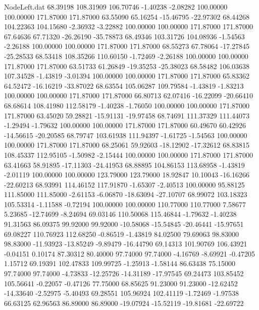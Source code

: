 \begin{filecontents}{NodeLeft.dat}
  68.39198  108.31909  106.70746    -1.40238   -2.08282  100.00000  100.00000  171.87000  171.87000   63.55090   65.16254  -15.46795  -22.97302
  68.44268  104.22363  104.15680    -2.36932   -3.22882  100.00000  100.00000  171.87000  171.87000   67.64636   67.71320  -26.26190  -35.78873
  68.49346  103.31726  104.08936    -1.54563   -2.26188  100.00000  100.00000  171.87000  171.87000   68.55273   67.78064  -17.27845  -25.28533
  68.53418  108.35266  110.60150    -1.72469   -2.26188  100.00000  100.00000  171.87000  171.87000   63.51733   61.26849  -19.35253  -25.38023
  68.58482  106.03638  107.34528    -1.43819   -3.01394  100.00000  100.00000  171.87000  171.87000   65.83362   64.52472  -16.16219  -33.87022
  68.63554  105.06287  109.79584    -1.43819   -1.83213  100.00000  100.00000  171.87000  171.87000   66.80713   62.07416  -16.22099  -20.66410
  68.68614  108.41980  112.58179    -1.40238   -1.76050  100.00000  100.00000  171.87000  171.87000   63.45020   59.28821  -15.91131  -19.97458
  68.74691  111.37329  111.44073    -1.29494   -1.79632  100.00000  100.00000  171.87000  171.87000   60.49670   60.42926  -14.56615  -20.20585
  68.79747  103.61938  111.94397    -1.61725   -1.54563  100.00000  100.00000  171.87000  171.87000   68.25061   59.92603  -18.12902  -17.32612
  68.83815  108.45337  112.95105    -1.50982   -2.15444  100.00000  100.00000  171.87000  171.87000   63.41663   58.91895  -17.11303  -24.41953
  68.88895  104.86153  113.68958    -1.43819   -2.01119  100.00000  100.00000  123.79000  123.79000   18.92847   10.10043  -16.16266  -22.60213
  68.93991  114.46152  117.91870    -1.65307   -2.40513  100.00000   95.88125  111.85000  111.85000   -2.61153   -6.06870  -18.63094  -27.10707
  68.99072  103.18323  105.53314    -1.11588   -0.72194  100.00000  100.00000  110.77000  110.77000    7.58677    5.23685  -12.74699   -8.24694
  69.03146  110.50068  115.46844    -1.79632   -1.40238   91.31563   86.09375   99.92000   99.92000  -10.58068  -15.54845  -20.46441  -15.97651
  69.08227  110.76923  112.68250    -0.86519   -1.43819   84.02500   79.69063   98.83000   98.83000  -11.93923  -13.85249   -9.89479  -16.44790
  69.14313  101.90769  106.43921    -0.04151    0.10174   87.30312   80.40000   97.74000   97.74000   -4.16769   -8.69921   -0.47205    1.15712
  69.19391  102.47833  109.99725    -1.25913   -1.58144   86.63438   75.15000   97.74000   97.74000   -4.73833  -12.25726  -14.31189  -17.97545
  69.24473  103.85452  105.56641    -0.22057   -0.47126   77.75000   68.85625   91.23000   91.23000  -12.62452  -14.33640   -2.52975   -5.40493
  69.28551  105.96924  102.41119    -1.72469   -1.97538   66.63125   62.96563   86.89000   86.89000  -19.07924  -15.52119  -19.81681  -22.69722

\end{filecontents}
